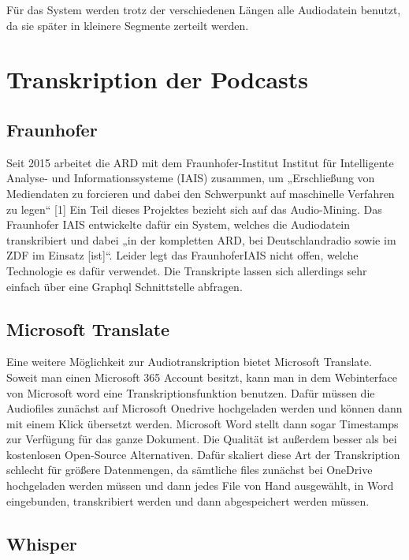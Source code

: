 Für das System werden trotz der verschiedenen Längen alle Audiodatein benutzt, da sie später in kleinere Segmente zerteilt werden.



\section{Transkription der Podcasts}


\subsection{Fraunhofer}

Seit 2015 arbeitet die ARD mit dem Fraunhofer-Institut Institut für Intelligente Analyse- und Informationssysteme (IAIS) zusammen, um „Erschließung von Mediendaten zu forcieren und dabei den Schwerpunkt auf maschinelle Verfahren zu legen“ [1]
Ein Teil dieses Projektes bezieht sich auf das Audio-Mining. 
Das Fraunhofer IAIS entwickelte dafür ein System, welches die Audiodatein transkribiert und dabei „in der kompletten ARD, bei Deutschlandradio sowie im ZDF im Einsatz [ist]“. 
Leider legt das FraunhoferIAIS nicht offen, welche Technologie es dafür verwendet. 
Die Transkripte lassen sich allerdings sehr einfach über eine Graphql Schnittstelle abfragen. 

\subsection{Microsoft Translate}

Eine weitere Möglichkeit zur Audiotranskription bietet Microsoft Translate. 
Soweit man einen Microsoft 365 Account besitzt, kann man in dem Webinterface von Microsoft word eine Transkriptionsfunktion benutzen. 
Dafür müssen die Audiofiles zunächst auf Microsoft Onedrive hochgeladen werden und können dann mit einem Klick übersetzt werden. 
Microsoft Word stellt dann sogar Timestamps  zur Verfügung für das ganze Dokument. 
Die Qualität ist außerdem besser als bei kostenlosen Open-Source Alternativen. 
Dafür skaliert diese Art der Transkription schlecht für größere Datenmengen, da sämtliche files zunächst bei OneDrive hochgeladen werden müssen und dann jedes File von Hand ausgewählt, in Word eingebunden, transkribiert werden und dann abgespeichert werden müssen. 

\subsection{Whisper}

